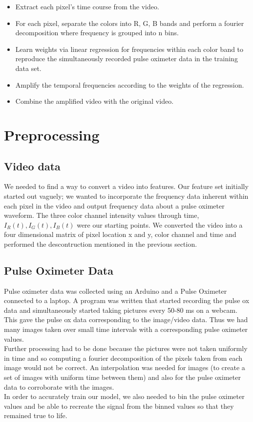 \documentclass[12pt]{article}
\begin{document}
\begin{itemize}
\item Extract each pixel’s time course from the video. 
\item For each pixel, separate the colors into R, G, B bands and perform a fourier decomposition where frequency is grouped into n bins.
\item Learn weights via linear regression for frequencies within each color band to reproduce the simultaneously recorded pulse oximeter data in the training data set. 
\item Amplify the temporal frequencies according to the weights of the regression.
\item Combine the amplified video with the original video.
\end{itemize}


  


\section{Preprocessing}
\subsection{Video data}
  We needed to find a way to convert a video into features.
  Our feature set initially started out vaguely; we wanted to incorporate the frequency data inherent within each pixel in the video and output frequency data about a pulse oximeter waveform.
  The three color channel intensity values through time, \(I_R(t), I_G(t), I_B(t)\) were our starting points.
  We converted the video into a four dimensional matrix of pixel location x and y, color channel and time and performed the descontruction mentioned in the previous section.
  
\subsection{Pulse Oximeter Data}
  Pulse oximeter data was collected using an Arduino and a Pulse Oximeter connected to a laptop. 
  A program was written that started recording the pulse ox data and simultaneously started taking pictures every 50-80 ms on a webcam.
  This gave the pulse ox data corresponding to the image/video data.
  Thus we had many images taken over small time intervals with a corresponding pulse oximeter values.
  \\
  Further processing had to be done because the pictures were not taken uniformly in time and so computing a fourier decomposition of the pixels taken from each image would not be correct.
  An interpolation was needed for images (to create a set of images with uniform time between them) and also for the pulse oximeter data to corroborate with the images.
  \\
  In order to accurately train our model, we also needed to bin the pulse oximeter values and be able to recreate the signal from the binned values so that they remained true to life.
  
\end{document}
